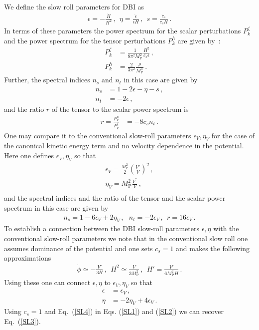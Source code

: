 \documentclass[a4paper,11pt]{article}
\def\non{\nonumber\\}
\def\non{\nonumber\\}
\begin{document}
  We define the slow roll parameters for DBI as~\cite{Maldacena:2002vr,Seery:2005wm,Seery:2005gb,Chen:2005fe,Chen:2006nt,Lyth:2005fi}
  \begin{align}
    \epsilon= -\frac{\dot H}{H^2}\,,~~\eta= \frac{\dot \epsilon}{\epsilon H}\,,~~
    s= \frac{\dot c_s}{c_s H}\,.
  \end{align}
  In terms of these parameters the power spectrum for the scalar perturbations $P_k^{\zeta}$
  and the power spectrum for the tensor perturbations $P_k^h$ are given by~\cite{Garriga:1999vw,ArmendarizPicon:1999rj}:
  \begin{align}
    P_k^{\zeta}&= \frac{1}{8\pi^2 M_\text{P}^2} \frac{H^2}{c_s \epsilon}\,,\non
    P_k^h &= \frac{2}{3\pi^2} \frac{\rho}{M_\text{P}^4}\,.
  \end{align}
  Further, the spectral indices $n_s$ and $n_t$ in this case are given by
  \begin{align}
    n_s&= 1-2 \epsilon -\eta -s\,,\non
    n_t&=- 2\epsilon\,,
    \label{SL1}
  \end{align}
  and the ratio $r$ of the tensor to the scalar power spectrum is \cite{Garriga:1999vw}
  \begin{align}
    r=\frac{P_k^h}{P_k^{\zeta}} &= - 8 c_s n_t\,.
    \label{SL2}
  \end{align}
  One may compare it to the conventional slow-roll parameters $\epsilon_V, \eta_V$
  for the case of the canonical kinetic energy term and no velocity dependence in the potential.
  Here one defines $\epsilon_V, \eta_V$ so that
  \begin{align}
    \epsilon_V= \frac{M_\text{P}^2}{2} \left(\frac{V'}{V}\right)^2\,,\non
    \eta_V= M_\text{P}^2 \frac{V^{''}}{V}\,,\non
  \end{align}
  and the spectral indices and the ratio of the tensor and the scalar power spectrum in this case are given by
  \begin{align}
    n_s=1- 6 \epsilon_V+ 2 \eta_V\,,~~~
    n_t= - 2 \epsilon_V\,,~~ r= 16 \epsilon_V\,.
    \label{SL3}
  \end{align}
  To establish a connection between the DBI slow-roll parameters $\epsilon, \eta$ with the conventional slow-roll parameters we note
  that in the conventional slow roll one assumes dominance of the potential and one sets $c_s=1$ and makes the following approximations
  \begin{align}
    \dot \phi\simeq - \frac{V'}{3H}\,,
    ~~H^2\simeq \frac{V}{3M_\text{P}^2}\,,~~H'= \frac{V'}{6M_\text{P}^2 H}\,.
    \label{approx1}
  \end{align}
  Using these one can connect $\epsilon, \eta$ to $\epsilon_V, \eta_V$ so that
  \begin{align}
    \epsilon&= \epsilon_V\,,\non
    \eta &= -2 \eta_V + 4 \epsilon_V\,.
    \label{SL4}
  \end{align}
  Using $c_s=1$ and Eq.~(\ref{SL4}) in Eqs. (\ref{SL1}) and (\ref{SL2}) we can recover Eq.~(\ref{SL3}).
\end{document}
